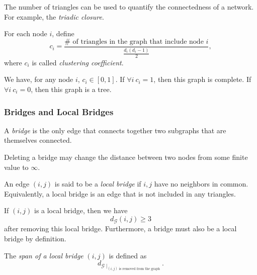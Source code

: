 \begin{eg}
	The number of triangles can be used to quantify the connectedness of a network. For example, the \emph{triadic closure}.
\end{eg}

\begin{definition}
	For each node \(i\), define
	\[
		c_{i} = \dfrac{\#\text{ of triangles in the graph that include node }i}{\frac{d_{i}(d_{i}-1)}{2}},
	\]
	where \(c_{i}\) is called \emph{clustering coefficient}.
\end{definition}
\begin{remark}
	We have, for any node \(i\), \(c_{i}\in \left[ 0, 1 \right].\) If \(\forall i\ c_{i} = 1\), then this graph is complete. If \(\forall i\ c_{i} = 0\), then
	this graph is a tree.
\end{remark}

\subsubsection{Bridges and Local Bridges}
\begin{definition}
	A \emph{bridge} is the only edge that connects together two subgraphs that are themselves connected.
\end{definition}

\begin{remark}
	Deleting a bridge may change the distance between two nodes from some finite value to \(\infty\).
\end{remark}

\begin{definition}
	An edge \((i, j)\) is said to be a \emph{local bridge} if \(i, j\) have no neighbors in common. Equivalently, a local bridge is an edge that is not included in any
	triangles.
\end{definition}

\begin{remark}
	If \((i, j)\) is a local bridge, then we have
	\[
		d_{\mathcal{G}}(i, j) \geq  3
	\]
	after removing this local bridge. Furthermore, a bridge must also be a local bridge by definition.
\end{remark}

\begin{definition}
	The \emph{span of a local bridge} \((i, j)\) is defined as
	\[
		d_{\mathcal{G}\mid_{(i, j)\text{ is removed from the graph}}}.
	\]
\end{definition}

